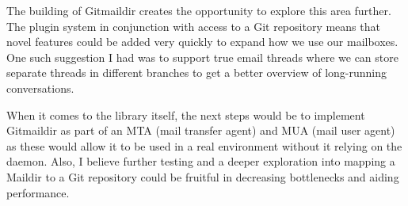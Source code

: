 The building of Gitmaildir creates the opportunity to explore this area further. The plugin system in conjunction with access to a Git repository means that novel features could be added very quickly to expand how we use our mailboxes. One such suggestion I had was to support true email threads where we can store separate threads in different branches to get a better overview of long-running conversations.

When it comes to the library itself, the next steps would be to implement Gitmaildir as part of an MTA (mail transfer agent) and MUA (mail user agent) as these would allow it to be used in a real environment without it relying on the daemon. Also, I believe further testing and a deeper exploration into mapping a Maildir to a Git repository could be fruitful in decreasing bottlenecks and aiding performance.

